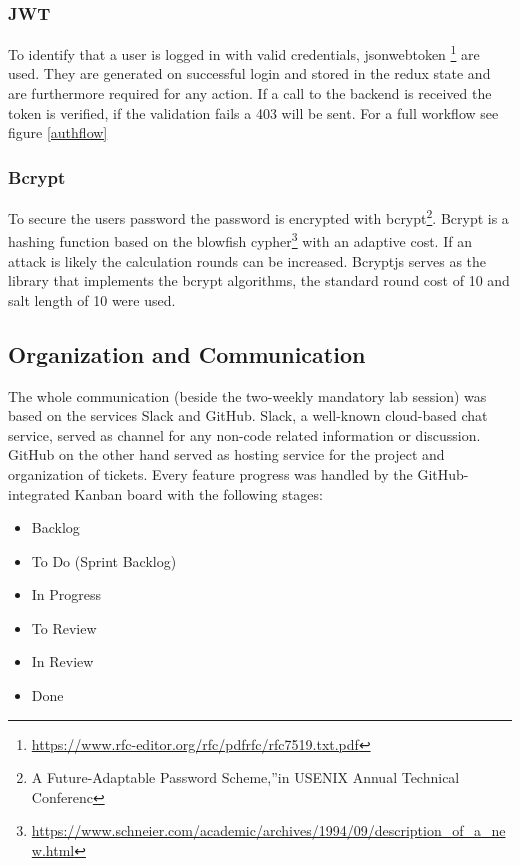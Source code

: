 \subsubsection{JWT}
To identify that a user is logged in with valid credentials, jsonwebtoken \footnote{\url{https://www.rfc-editor.org/rfc/pdfrfc/rfc7519.txt.pdf}} are used. They are generated on successful login and stored in the redux state and are furthermore required for any action. If a call to the backend is received the token is verified, if the validation fails a 403 will be sent. For a full workflow see figure \ref{authflow}

\subsubsection{Bcrypt}
To secure the users password the password is encrypted with bcrypt\footnote{A  Future-Adaptable  Password  Scheme,”in USENIX Annual Technical Conferenc}. Bcrypt is a hashing function based on the blowfish cypher\footnote{\url{https://www.schneier.com/academic/archives/1994/09/description\_of\_a\_new.html}} with an adaptive cost. If an attack is likely the calculation rounds can be increased. Bcryptjs serves as the library that implements the bcrypt algorithms, the standard round cost of 10 and salt length of 10 were used.

\subsection{Organization and Communication}
The whole communication (beside the two-weekly mandatory lab session) was based on the services Slack and GitHub. Slack, a well-known cloud-based chat service, served as channel for any non-code related information or discussion. GitHub on the other hand served as hosting service for the project and organization of tickets. Every feature progress was handled by the GitHub-integrated Kanban board with the following stages:
\begin{itemize}
	\item Backlog
	\item To Do (Sprint Backlog)
	\item In Progress
	\item To Review
	\item In Review
	\item Done
\end{itemize}

